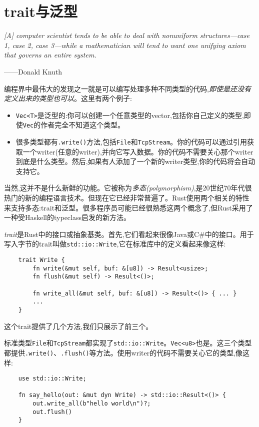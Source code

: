 \chapter{trait与泛型}\label{ch11}

\emph{[A] computer scientist tends to be able to deal with nonuniform structures—case 1, case 2, case 3—while a mathematician will tend to want one unifying axiom that governs an entire system.}

\begin{flushright}
    ——Donald Knuth
\end{flushright}

编程界中最伟大的发现之一就是可以编写处理多种不同类型的代码,\emph{即使是还没有定义出来的类型也可以}。这里有两个例子:
\begin{itemize}
    \item \texttt{Vec<T>}是泛型的:你可以创建一个任意类型的vector,包括你自己定义的类型,即使\texttt{Vec}的作者完全不知道这个类型。
    \item 很多类型都有\texttt{.write()}方法,包括\texttt{File}和\texttt{TcpStream}。你的代码可以通过引用获取一个writer(任意的writer),并向它写入数据。你的代码不需要关心那个writer到底是什么类型。然后,如果有人添加了一个新的writer类型,你的代码将会自动支持它。
\end{itemize}

当然,这并不是什么新鲜的功能。它被称为\emph{多态(polymorphism)},是20世纪70年代很热门的新的编程语言技术。但现在它已经非常普遍了。Rust使用两个相关的特性来支持多态:trait和泛型。很多程序员可能已经很熟悉这两个概念了,但Rust采用了一种受Haskell的typeclass启发的新方法。

\emph{trait}是Rust中的接口或抽象基类。首先,它们看起来很像Java或C\#中的接口。用于写入字节的trait叫做\texttt{std::io::Write},它在标准库中的定义看起来像这样:
\begin{verbatim}
    trait Write {
        fn write(&mut self, buf: &[u8]) -> Result<usize>;
        fn flush(&mut self) -> Result<()>;

        fn write_all(&mut self, buf: &[u8]) -> Result<()> { ... }
        ...
    }
\end{verbatim}

这个trait提供了几个方法,我们只展示了前三个。

标准类型\texttt{File}和\texttt{TcpStream}都实现了\texttt{std::io::Write}。\texttt{Vec<u8>}也是。这三个类型都提供\texttt{.write()}、\texttt{.flush()}等方法。使用writer的代码不需要关心它的类型,像这样:
\begin{verbatim}
    use std::io::Write;

    fn say_hello(out: &mut dyn Write) -> std::io::Result<()> {
        out.write_all(b"hello world\n")?;
        out.flush()
    }
\end{verbatim}

